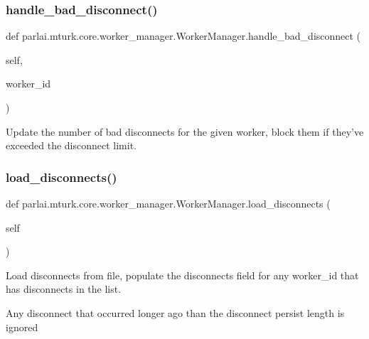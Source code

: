 \subsubsection{\texorpdfstring{handle\+\_\+bad\+\_\+disconnect()}{handle\_bad\_disconnect()}}
{\footnotesize\ttfamily def parlai.\+mturk.\+core.\+worker\+\_\+manager.\+Worker\+Manager.\+handle\+\_\+bad\+\_\+disconnect (\begin{DoxyParamCaption}\item[{}]{self,  }\item[{}]{worker\+\_\+id }\end{DoxyParamCaption})}

\begin{DoxyVerb}Update the number of bad disconnects for the given worker, block them if they've
exceeded the disconnect limit.
\end{DoxyVerb}
 \mbox{\label{classparlai_1_1mturk_1_1core_1_1worker__manager_1_1WorkerManager_aac0a3b7f87f3f60035cbb35155ea480d}} 
\subsubsection{\texorpdfstring{load\+\_\+disconnects()}{load\_disconnects()}}
{\footnotesize\ttfamily def parlai.\+mturk.\+core.\+worker\+\_\+manager.\+Worker\+Manager.\+load\+\_\+disconnects (\begin{DoxyParamCaption}\item[{}]{self }\end{DoxyParamCaption})}

\begin{DoxyVerb}Load disconnects from file, populate the disconnects field for any worker_id
that has disconnects in the list.

Any disconnect that occurred longer ago than the disconnect persist length is
ignored
\end{DoxyVerb}
 \mbox{\label{classparlai_1_1mturk_1_1core_1_1worker__manager_1_1WorkerManager_a252814b16fd59e725345146e6004e90a}} 
